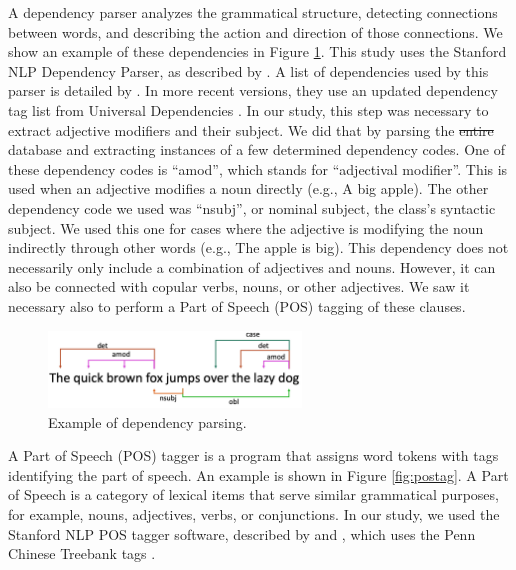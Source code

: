 \documentclass[smallextended,natbib]{svjour3}       %
\providecommand{\DIFdel}[1]{{\protect\color{red}\sout{#1}}}                      %
\providecommand{\DIFdelbegin}{} %
\providecommand{\DIFdelend}{} %
\newcommand{\DIFscaledelfig}{0.5}
\newlength{\DIFdelgraphicswidth} %
\newlength{\DIFdelgraphicsheight} %
\newcommand{\DIFdelincludegraphics}[2][]{%
\sbox{\DIFdelgraphicsbox}{\DIFOincludegraphics[#1]{#2}}%
\settoboxwidth{\DIFdelgraphicswidth}{\DIFdelgraphicsbox} %
\settoboxtotalheight{\DIFdelgraphicsheight}{\DIFdelgraphicsbox} %
\scalebox{\DIFscaledelfig}{%
\parbox[b]{\DIFdelgraphicswidth}{\usebox{\DIFdelgraphicsbox}\\[-\baselineskip] \rule{\DIFdelgraphicswidth}{0em}}\llap{\resizebox{\DIFdelgraphicswidth}{\DIFdelgraphicsheight}{%
\setlength{\unitlength}{\DIFdelgraphicswidth}%
\begin{picture}(1,1)%
\thicklines\linethickness{2pt} %
{\color[rgb]{1,0,0}\put(0,0){\framebox(1,1){}}}%
{\color[rgb]{1,0,0}\put(0,0){\line( 1,1){1}}}%
{\color[rgb]{1,0,0}\put(0,1){\line(1,-1){1}}}%
\end{picture}%
}\hspace*{3pt}}} %
} %
\DeclareRobustCommand{\DIFdelbegin}{\DIFOdelbegin \let\includegraphics\DIFdelincludegraphics} %
\DeclareRobustCommand{\DIFdelend}{\DIFOaddend \let\includegraphics\DIFOincludegraphics} %
\begin{document}
    A dependency parser analyzes the grammatical structure, detecting connections between words, and describing the action and direction of those connections. We show an example of these dependencies in Figure \ref{fig:depparse}. This study uses the Stanford NLP Dependency Parser, as described by \cite{chen-EMNLP:2014}. A list of dependencies used by this parser is detailed by \cite{marneffe_manning_2016_depparse_manual}. In more recent versions, they use an updated dependency tag list from Universal Dependencies \cite[][]{zeman2018conll}. In our study, this step was necessary to extract adjective modifiers and their subject. We did that by parsing the \DIFdelbegin \DIFdel{entire }\DIFdelend database and extracting instances of a few determined dependency codes. One of these dependency codes is ``amod'', which stands for ``adjectival modifier''. This is used when an adjective modifies a noun directly (e.g., A big apple). The other dependency code we used was ``nsubj'', or nominal subject, the class's syntactic subject. We used this one for cases where the adjective is modifying the noun indirectly through other words (e.g., The apple is big). This dependency does not necessarily only include a combination of adjectives and nouns. However, it can also be connected with copular verbs, nouns, or other adjectives. We saw it necessary also to perform a Part of Speech (POS) tagging of these clauses.

    \begin{figure}[ht]
    \centering
    \includegraphics[width=0.6\textwidth]{depparse.png}
    \caption{Example of dependency parsing.}
    \label{fig:depparse}
    \end{figure}

    A Part of Speech (POS) tagger is a program that assigns word tokens with tags identifying the part of speech. An example is shown in Figure \ref{fig:postag}. A Part of Speech is a category of lexical items that serve similar grammatical purposes, for example, nouns, adjectives, verbs, or conjunctions. In our study, we used the Stanford NLP POS tagger software, described by \cite{toutanova2000enriching} and \cite{toutanova2003feature}, which uses the Penn Chinese Treebank tags \cite[][]{xia_penntreebank}.
\end{document}
